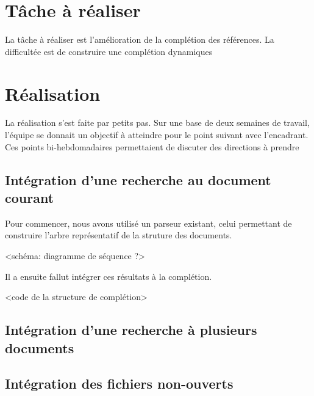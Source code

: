 \documentclass[a4paper,11pt]{report}
\begin{document}
\section{Tâche à réaliser} %
\label{sec:tache_a_realiser}
La tâche à réaliser est l'amélioration de la complétion des références. La difficultée est de construire une complétion dynamiques


\section{Réalisation}
La réalisation s'est faite par petits pas. Sur une base de deux semaines de travail, l'équipe se donnait un objectif à atteindre pour le point suivant avec l'encadrant.
Ces points bi-hebdomadaires permettaient de discuter des directions à prendre 

\subsection{Intégration d'une recherche au document courant}
Pour commencer, nous avons utilisé un parseur existant, celui permettant de construire l'arbre représentatif de la struture des documents.

<schéma: diagramme de séquence ?>

Il a ensuite fallut intégrer ces résultats à la complétion.

<code de la structure de complétion> 

\subsection{Intégration d'une recherche à plusieurs documents}

\subsection{Intégration des fichiers non-ouverts}
\end{document}

